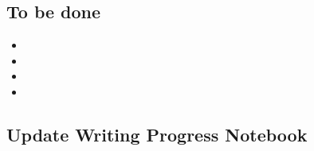\documentclass[10pt,letterpaper]{article}
\newcommand{\bi}{\begin{itemize}}
\newcommand{\ei}{\end{itemize}}
\begin{document}


\subsection{To be done}
\label{sub:to-do}


\bi
\item 
\item 
\item 
\item 
\ei




\subsection{Update Writing Progress Notebook}
\label{sub:WPsheet}

\end{document}
